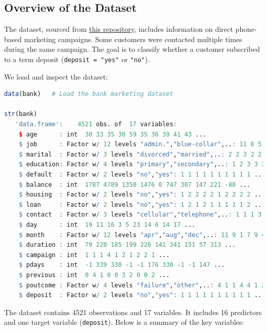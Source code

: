 \documentclass[
]{book}
\newcommand{\passthrough}[1]{#1}
\theoremstyle{definition}
\theoremstyle{definition}
\theoremstyle{definition}
\theoremstyle{definition}
\theoremstyle{remark}
\begin{document}
\subsection*{Overview of the Dataset}\label{overview-of-the-dataset-2}

The dataset, sourced from \href{https://rdrr.io/cran/liver/man/bank.html}{this repository}, includes information on direct phone-based marketing campaigns. Some customers were contacted multiple times during the same campaign. The goal is to classify whether a customer subscribed to a term deposit (\passthrough{\lstinline!deposit = "yes"!} or \passthrough{\lstinline!"no"!}).

We load and inspect the dataset:

\begin{lstlisting}[language=R]
data(bank)   # Load the bank marketing dataset 

str(bank)
   'data.frame':    4521 obs. of  17 variables:
    $ age      : int  30 33 35 30 59 35 36 39 41 43 ...
    $ job      : Factor w/ 12 levels "admin.","blue-collar",..: 11 8 5 5 2 5 7 10 3 8 ...
    $ marital  : Factor w/ 3 levels "divorced","married",..: 2 2 3 2 2 3 2 2 2 2 ...
    $ education: Factor w/ 4 levels "primary","secondary",..: 1 2 3 3 2 3 3 2 3 1 ...
    $ default  : Factor w/ 2 levels "no","yes": 1 1 1 1 1 1 1 1 1 1 ...
    $ balance  : int  1787 4789 1350 1476 0 747 307 147 221 -88 ...
    $ housing  : Factor w/ 2 levels "no","yes": 1 2 2 2 2 1 2 2 2 2 ...
    $ loan     : Factor w/ 2 levels "no","yes": 1 2 1 2 1 1 1 1 1 2 ...
    $ contact  : Factor w/ 3 levels "cellular","telephone",..: 1 1 1 3 3 1 1 1 3 1 ...
    $ day      : int  19 11 16 3 5 23 14 6 14 17 ...
    $ month    : Factor w/ 12 levels "apr","aug","dec",..: 11 9 1 7 9 4 9 9 9 1 ...
    $ duration : int  79 220 185 199 226 141 341 151 57 313 ...
    $ campaign : int  1 1 1 4 1 2 1 2 2 1 ...
    $ pdays    : int  -1 339 330 -1 -1 176 330 -1 -1 147 ...
    $ previous : int  0 4 1 0 0 3 2 0 0 2 ...
    $ poutcome : Factor w/ 4 levels "failure","other",..: 4 1 1 4 4 1 2 4 4 1 ...
    $ deposit  : Factor w/ 2 levels "no","yes": 1 1 1 1 1 1 1 1 1 1 ...
\end{lstlisting}

The dataset contains 4521 observations and 17 variables. It includes 16 predictors and one target variable (\passthrough{\lstinline!deposit!}). Below is a summary of the key variables:
\end{document}
